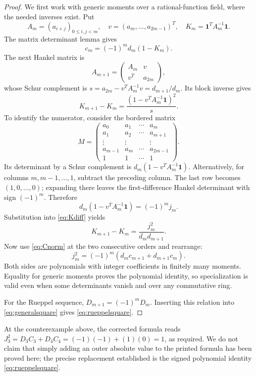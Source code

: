 \documentclass[11pt,a4paper]{article}
\numberwithin{equation}{section}
\theoremstyle{definition}
\theoremstyle{remark}
\newcommand{\one}{\boldsymbol 1}
\begin{document}
\begin{proof}
We first work with generic moments over a rational-function field,
where the needed inverses exist. Put
\[
 A_m=(a_{i+j})_{0\le i,j<m},\quad
 v=(a_m,\ldots,a_{2m-1})^T,\quad
 K_m=\one^TA_m^{-1}\one.
\]
The matrix determinant lemma gives
\begin{equation}\label{eq:Cnorm}
 c_m=(-1)^m d_m(1-K_m).
\end{equation}
The next Hankel matrix is
\[
 A_{m+1}=\begin{pmatrix}A_m&v\\v^T&a_{2m}\end{pmatrix},
\]
whose Schur complement is
$s=a_{2m}-v^TA_m^{-1}v=d_{m+1}/d_m$. Its block inverse gives
\begin{equation}\label{eq:Kdiff}
 K_{m+1}-K_m
 =\frac{(1-v^TA_m^{-1}\one)^2}{s}.
\end{equation}
To identify the numerator, consider the bordered matrix
\[
 M=\begin{pmatrix}
 a_0&a_1&\cdots&a_m\\
 a_1&a_2&\cdots&a_{m+1}\\
 \vdots&\vdots&&\vdots\\
 a_{m-1}&a_m&\cdots&a_{2m-1}\\
 1&1&\cdots&1
 \end{pmatrix}.
\]
Its determinant by a Schur complement is
$d_m(1-v^TA_m^{-1}\one)$. Alternatively, for columns $m,m-1,\ldots,1$,
subtract the preceding column. The last row becomes $(1,0,\ldots,0)$;
expanding there leaves the first-difference Hankel determinant with
sign $(-1)^m$. Therefore
\[
 d_m(1-v^TA_m^{-1}\one)=(-1)^m j_m.
\]
Substitution into \eqref{eq:Kdiff} yields
\[
 K_{m+1}-K_m=\frac{j_m^2}{d_md_{m+1}}.
\]
Now use \eqref{eq:Cnorm} at the two consecutive orders and rearrange:
\[
 j_m^2=(-1)^m(d_mc_{m+1}+d_{m+1}c_m).
\]
Both sides are polynomials with integer coefficients in finitely many
moments. Equality for generic moments proves the polynomial identity,
so specialization is valid even when some determinants vanish and over
any commutative ring.

For the Rueppel sequence, $D_{m+1}=(-1)^mD_m$. Inserting this relation
into \eqref{eq:generalsquare} gives \eqref{eq:rueppelsquare}.
\end{proof}

At the counterexample above, the corrected formula reads
$J_3^2=D_3C_3+D_4C_4=(-1)(-1)+(1)(0)=1$, as required.
We do not claim that simply adding an outer absolute value to the
printed formula has been proved here; the precise replacement established
is the signed polynomial identity \eqref{eq:rueppelsquare}.
\end{document}

